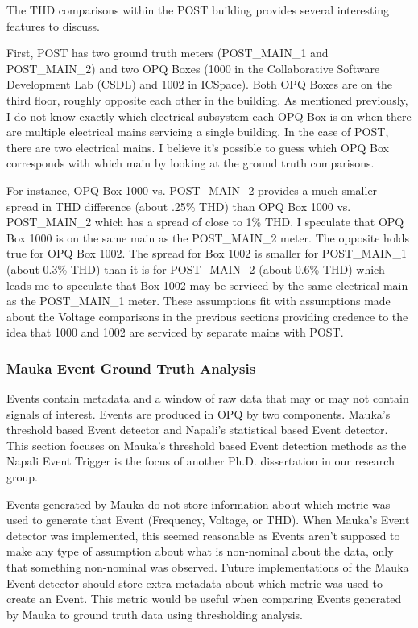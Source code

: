 The THD comparisons within the POST building provides several interesting features to discuss.

First, POST has two ground truth meters (POST\_MAIN\_1 and POST\_MAIN\_2) and two OPQ Boxes (1000 in the Collaborative Software Development Lab (CSDL) and 1002 in ICSpace). Both OPQ Boxes are on the third floor, roughly opposite each other in the building. As mentioned previously, I do not know exactly which electrical subsystem each OPQ Box is on when there are multiple electrical mains servicing a single building. In the case of POST, there are two electrical mains. I believe it's possible to guess which OPQ Box corresponds with which main by looking at the ground truth comparisons.

For instance, OPQ Box 1000 vs. POST\_MAIN\_2 provides a much smaller spread in THD difference (about .25\% THD) than OPQ Box 1000 vs. POST\_MAIN\_2 which has a spread of close to 1\% THD. I speculate that OPQ Box 1000 is on the same main as the POST\_MAIN\_2 meter. The opposite holds true for OPQ Box 1002. The spread for Box 1002 is smaller for POST\_MAIN\_1 (about 0.3\% THD) than it is for POST\_MAIN\_2 (about 0.6\% THD) which leads me to speculate that Box 1002 may be serviced by the same electrical main as the POST\_MAIN\_1 meter. These assumptions fit with assumptions made about the Voltage comparisons in the previous sections providing credence to the idea that 1000 and 1002 are serviced by separate mains with POST.


\subsubsection{Mauka Event Ground Truth Analysis}

Events contain metadata and a window of raw data that may or may not contain signals of interest. Events are produced in OPQ by two components. Mauka's threshold based Event detector and Napali's statistical based Event detector. This section focuses on Mauka's threshold based Event detection methods as the Napali Event Trigger is the focus of another Ph.D. dissertation in our research group.

Events generated by Mauka do not store information about which metric was used to generate that Event (Frequency, Voltage, or THD). When Mauka's Event detector was implemented, this seemed reasonable as Events aren't supposed to make any type of assumption about what is non-nominal about the data, only that something non-nominal was observed. Future implementations of the Mauka Event detector should store extra metadata about which metric was used to create an Event. This metric would be useful when comparing Events generated by Mauka to ground truth data using thresholding analysis.

